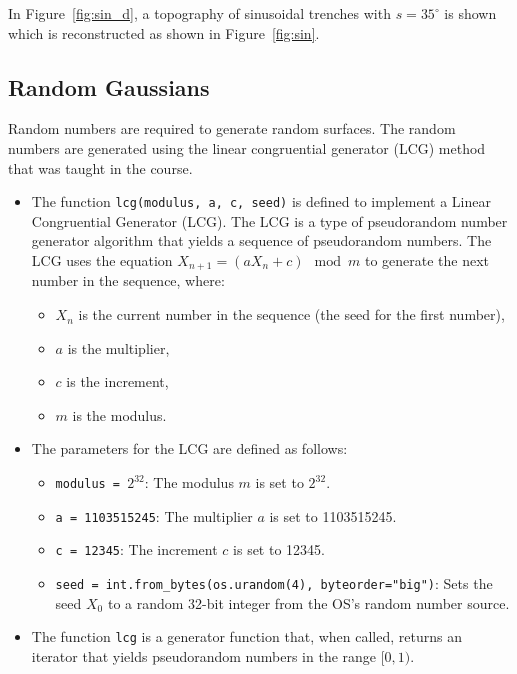 \documentclass{optica-article}
\begin{document}
In Figure~\ref{fig:sin_d}, a topography of sinusoidal trenches with $s = 35^\circ$ is 
shown which is reconstructed as shown in Figure~\ref{fig:sin}.

\subsection{Random Gaussians}
Random numbers are required to generate random surfaces. The random numbers are generated 
using the linear congruential generator (LCG) method that was taught in the course. 

\begin{itemize}
	\item The function \texttt{lcg(modulus, a, c, seed)} is defined to implement a Linear Congruential Generator (LCG). The LCG is a type of pseudorandom number generator algorithm that yields a sequence of pseudorandom numbers. The LCG uses the equation $X_{n+1} = (aX_n + c) \mod m$ to generate the next number in the sequence, where:
		\begin{itemize}
		\item $X_n$ is the current number in the sequence (the seed for the first number),
		\item $a$ is the multiplier,
		\item $c$ is the increment,
		\item $m$ is the modulus.
		\end{itemize}
	\item The parameters for the LCG are defined as follows:
		\begin{itemize}
		\item \texttt{modulus = $2^{32}$}: The modulus $m$ is set to $2^{32}$.
		\item \texttt{a = 1103515245}: The multiplier $a$ is set to 1103515245.
		\item \texttt{c = 12345}: The increment $c$ is set to 12345.
		\item \texttt{seed = int.from\_bytes(os.urandom(4), byteorder="big")}: Sets the seed $X_0$ to a random 32-bit integer from the OS's random number source.
		\end{itemize}
	\item The function \texttt{lcg} is a generator function that, when called, returns an iterator that yields pseudorandom numbers in the range $[0, 1)$.
	\end{itemize}
\end{document}

